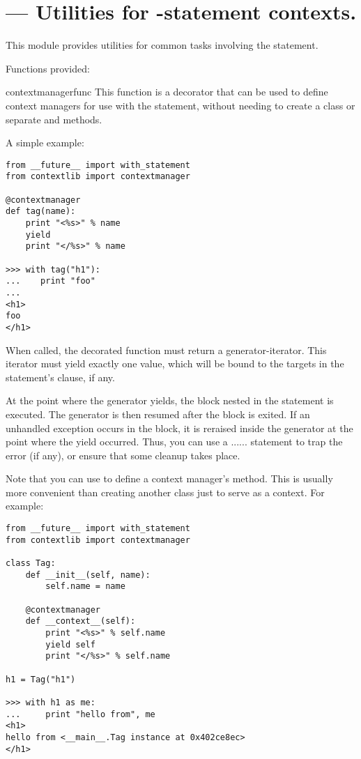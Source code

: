 \section{ ---
         Utilities for -statement contexts.}


This module provides utilities for common tasks involving the
 statement.

Functions provided:

\begin{funcdesc}{contextmanager}{func}
This function is a decorator that can be used to define context managers
for use with the  statement, without needing to create a
class or separate  and  methods.

A simple example:

\begin{verbatim}
from __future__ import with_statement
from contextlib import contextmanager

@contextmanager
def tag(name):
    print "<%s>" % name
    yield
    print "</%s>" % name

>>> with tag("h1"):
...    print "foo"
...
<h1>
foo
</h1>
\end{verbatim}

When called, the decorated function must return a generator-iterator.
This iterator must yield exactly one value, which will be bound to the
targets in the  statement's  clause, if any.

At the point where the generator yields, the block nested in the
 statement is executed.  The generator is then resumed
after the block is exited.  If an unhandled exception occurs in the
block, it is reraised inside the generator at the point where the yield
occurred.  Thus, you can use a
...... statement to trap
the error (if any), or ensure that some cleanup takes place.

Note that you can use  to define a context
manager's  method.  This is usually more convenient
than creating another class just to serve as a context.  For example:

\begin{verbatim}
from __future__ import with_statement
from contextlib import contextmanager

class Tag:
    def __init__(self, name):
        self.name = name
        
    @contextmanager
    def __context__(self):
        print "<%s>" % self.name
        yield self
        print "</%s>" % self.name
        
h1 = Tag("h1")

>>> with h1 as me:
...     print "hello from", me
<h1>
hello from <__main__.Tag instance at 0x402ce8ec>
</h1>
\end{verbatim}
\end{funcdesc}

